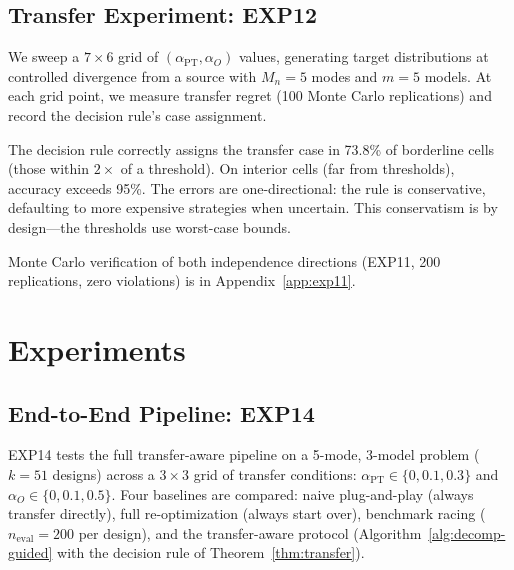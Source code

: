 \documentclass[11pt]{article}
\newcommand{\Mn}{M_n}
\begin{document}
\subsection{Transfer Experiment: EXP12}
\label{sec:exp12}

We sweep a $7 \times 6$ grid of
$(\alpha_{\mathrm{PT}}, \alpha_O)$ values,
generating target distributions at controlled divergence from a source
with $\Mn{=}5$ modes and $m{=}5$ models.  At each grid point, we measure
transfer regret (100 Monte Carlo replications) and record the decision
rule's case assignment.

The decision rule correctly assigns the transfer case in 73.8\% of
borderline cells (those within $2\times$ of a threshold).
On interior cells (far from thresholds), accuracy exceeds 95\%.
The errors are one-directional: the rule is conservative, defaulting to
more expensive strategies when uncertain.  This conservatism is by
design---the thresholds use worst-case bounds.

Monte Carlo verification of both independence directions (EXP11, 200 replications, zero violations) is in Appendix~\ref{app:exp11}.



\section{Experiments}
\label{sec:experiments}

\subsection{End-to-End Pipeline: EXP14}
\label{sec:exp14}

EXP14 tests the full transfer-aware pipeline on a 5-mode, 3-model
problem ($k{=}51$ designs) across a $3 \times 3$ grid of transfer
conditions: $\alpha_{\mathrm{PT}} \in \{0, 0.1, 0.3\}$ and
$\alpha_O \in \{0, 0.1, 0.5\}$.  Four baselines are compared:
naive plug-and-play (always transfer directly), full re-optimization
(always start over), benchmark racing ($n_{\mathrm{eval}}{=}200$ per
design), and the transfer-aware protocol (Algorithm~\ref{alg:decomp-guided}
with the decision rule of Theorem~\ref{thm:transfer}).
\end{document}
